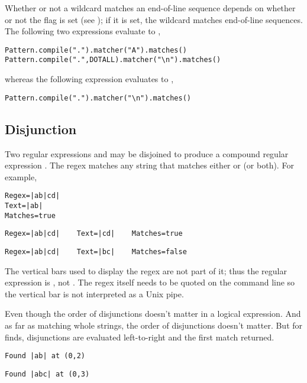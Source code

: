 Whether or not a wildcard matches an end-of-line sequence depends on
whether or not the  flag is set (see
); if it is set, the wildcard matches
end-of-line sequences.  The following two expressions evaluate to
,
%
\begin{verbatim}
Pattern.compile(".").matcher("A").matches()
Pattern.compile(".",DOTALL).matcher("\n").matches()
\end{verbatim}
%
whereas the following expression evaluates to ,
%
\begin{verbatim}
Pattern.compile(".").matcher("\n").matches()
\end{verbatim}
%




\subsection{Disjunction}

Two regular expressions  and  may be disjoined
to produce a compound regular expression
\code{|}.  The regex
\code{|} matches any string that matches either
 or  (or both).  For example,
%
\begin{verbatim}
Regex=|ab|cd|
Text=|ab|
Matches=true
\end{verbatim}
%
\begin{verbatim}
Regex=|ab|cd|    Text=|cd|    Matches=true
\end{verbatim}
%
\begin{verbatim}
Regex=|ab|cd|    Text=|bc|    Matches=false
\end{verbatim}
%
The vertical bars used to display the regex are not part of it; thus
the regular expression is , not .  The regex
itself needs to be quoted on the command line so the vertical bar is
not interpreted as a Unix pipe.

Even though the order of disjunctions doesn't matter in a logical
expression.  And as far as matching whole strings, the order of
disjunctions doesn't matter.  But for finds, disjunctions are
evaluated left-to-right and the first match returned.
%
\begin{verbatim}
Found |ab| at (0,2)
\end{verbatim}
%
\begin{verbatim}
Found |abc| at (0,3)
\end{verbatim}
%

